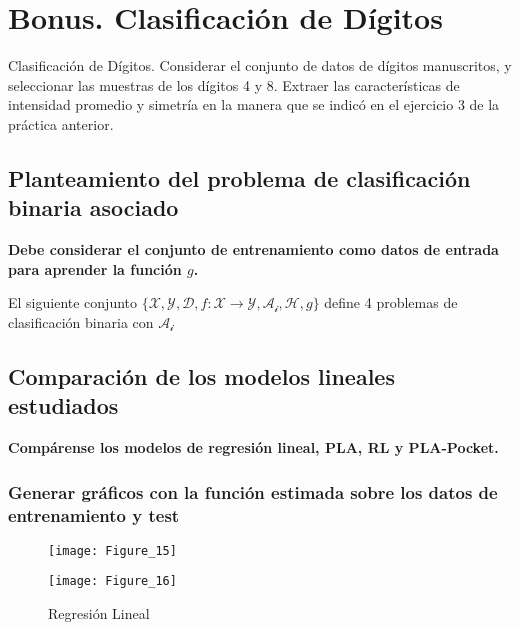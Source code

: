 \chapter{Bonus. Clasificación de Dígitos}

Clasificación de Dígitos. Considerar el conjunto de datos de dígitos
manuscritos, y seleccionar las muestras de los dígitos 4 y 8. 
Extraer las características de intensidad promedio y simetría en la
manera que se indicó en el ejercicio 3 de la práctica anterior.

\section{Planteamiento del problema de clasificación binaria asociado}

\textbf{Debe considerar el conjunto de entrenamiento como datos de entrada para aprender
la función $g$.}

El siguiente conjunto $\{\mathcal{X}, \mathcal{Y}, \mathcal{D}, f: \mathcal{X} \rightarrow \mathcal{Y}, \mathcal{A_i}, \mathcal{H}, g\}$
define 4 problemas de clasificación binaria con $\mathcal{A_i}$

\section{Comparación de los modelos lineales estudiados}

\textbf{Compárense los modelos de regresión lineal, PLA, RL y PLA-Pocket.}

\subsection{Generar gráficos con la función estimada sobre los datos de entrenamiento y test}

\begin{figure}[H]
    \caption{Regresión Lineal\medskip}
    \begin{minipage}[b]{.5\linewidth}
      \centering
      \texttt{[image: Figure\_15]}
       \label{subfig-5:dummy62}
    \end{minipage}
    \hfill \hfill
    \begin{minipage}[b]{.5\linewidth}
      \centering
      \texttt{[image: Figure\_16]}
    \end{minipage}
    \label{fig:dummy62}
\end{figure}

